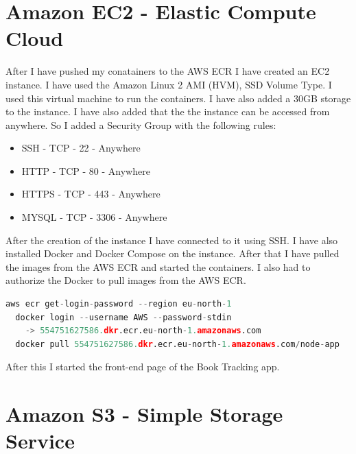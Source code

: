 \documentclass[11pt,a4paper,oneside]{report}
\begin{document}
\section{Amazon EC2 - Elastic Compute Cloud}
After I have pushed my conatainers to the AWS ECR I have created an EC2 instance.
I have used the Amazon Linux 2 AMI (HVM), SSD Volume Type. I used this virtual machine to run the containers. I have also added a 30GB storage to the instance. I have also added that the the instance can be accessed from anywhere. So I added a Security Group with the following rules:
\begin{itemize}
  \item SSH - TCP - 22 - Anywhere
  \item HTTP - TCP - 80 - Anywhere
  \item HTTPS - TCP - 443 - Anywhere
  \item MYSQL - TCP - 3306 - Anywhere
\end{itemize}

After the creation of the instance I have connected to it using SSH.
I have also installed Docker and Docker Compose on the instance.
After that I have pulled the images from the AWS ECR and started the containers.
I also had to authorize the Docker to pull images from the AWS ECR.


\begin{lstlisting}[language=Python,basicstyle=\ttfamily\small,]
  aws ecr get-login-password --region eu-north-1 
  docker login --username AWS --password-stdin 
    -> 554751627586.dkr.ecr.eu-north-1.amazonaws.com
  docker pull 554751627586.dkr.ecr.eu-north-1.amazonaws.com/node-app
\end{lstlisting}



After this I started the front-end page of the Book Tracking app.

\section{Amazon S3 - Simple Storage Service}
\end{document}
